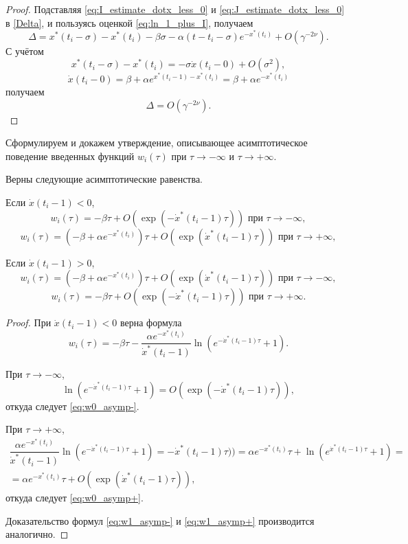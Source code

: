 \begin{proof}
	Подставляя \eqref{eq:I_estimate_dotx_less_0} и \eqref{eq:J_estimate_dotx_less_0} в \eqref{Delta}, и пользуясь оценкой \eqref{eq:ln_1_plus_I}, получаем
	\[
	\Delta = x^*(t_i - \sigma) - x^*(t_i) - \beta \sigma - \alpha (t - t_i - \sigma) e^{-x^*(t_i)} + O(\gamma^{-2\nu}).
	\]
	С учётом 
	\[
	x^*(t_i - \sigma) - x^*(t_i) = -\sigma\dot{x}(t_i - 0) + O(\sigma^2),
	\]
	\[
	\dot{x}(t_i - 0) = \beta + \alpha e^{x^*(t_i - 1) - x^*(t_i)} = \beta + \alpha e^{-x^*(t_i)}
	\]
	получаем
	\[
	\Delta = O(\gamma^{-2\nu}).
	\]
\end{proof}

Сформулируем и докажем утверждение, описывающее асимптотическое поведение введенных функций $w_i(\tau)$ при $\tau\to-\infty$ и $\tau\to+\infty$.
%
\begin{lemma}\label{lm:lem_w_asymp} Верны следующие асимптотические равенства.

Если $\dot{x}(t_i - 1) < 0$,
\begin{equation}
	\label{eq:w0_asymp-}
	w_i(\tau) = -\beta \tau + O(\exp(-\dot{x}^*(t_i - 1) \tau)) \text{ при } \tau \to -\infty,
\end{equation}
\begin{equation}
	\label{eq:w0_asymp+}
	w_i(\tau) = (-\beta + \alpha e^{-x^*(t_i)})\tau + O(\exp(\dot{x}^*(t_i - 1) \tau)) \text{ при } \tau \to +\infty,
\end{equation}
	
Если $\dot{x}(t_i - 1) > 0$,
\begin{equation}
	\label{eq:w1_asymp-}
	w_i(\tau) = (-\beta + \alpha e^{-x^*(t_i)})\tau + O(\exp(\dot{x}^*(t_i - 1) \tau)) \text{ при } \tau \to -\infty,
\end{equation}
\begin{equation}
	\label{eq:w1_asymp+}
	w_i(\tau) = -\beta \tau + O(\exp(-\dot{x}^*(t_i - 1) \tau)) \text{ при } \tau \to +\infty.
\end{equation}
\end{lemma}
\begin{proof}
	При $\dot{x}(t_i - 1) < 0$ верна формула
	\[
	w_i(\tau) = -\beta \tau - \dfrac{\alpha e^{-x^*(t_i)}}{\dot{x}^*(t_i - 1)} \ln\left(e^{-\dot{x}^*(t_i - 1)\tau} + 1\right).
	\]
	
	При $\tau \to -\infty$,
	\[
	\ln\left(e^{-\dot{x}^*(t_i - 1)\tau} + 1\right) = O(\exp(-\dot{x}^*(t_i - 1)\tau)),
	\]
	 откуда следует \eqref{eq:w0_asymp-}.
	 
	При $\tau \to +\infty$,
	\begin{multline*}
	\dfrac{\alpha e^{-x^*(t_i)}}{\dot{x}^*(t_i - 1)} \ln\left(e^{-\dot{x}^*(t_i - 1)\tau} + 1\right) = -\dot{x}^*(t_i - 1)\tau)) = \alpha e^{-x^*(t_i)} \tau + \ln\left(e^{\dot{x}^*(t_i - 1)\tau} + 1\right) =\\
	= \alpha e^{-x^*(t_i)} \tau + O(\exp(\dot{x}^*(t_i - 1) \tau)),
	\end{multline*}
	откуда следует \eqref{eq:w0_asymp+}.
	
	Доказательство формул \eqref{eq:w1_asymp-} и \eqref{eq:w1_asymp+} производится аналогично.
\end{proof}

